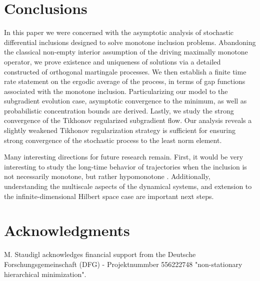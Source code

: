\documentclass[11pt,reqno]{article}
\newcommand{\1}{\mathds{1}}
\numberwithin{equation}{section}  %
\theoremstyle{plain}
\theoremstyle{definition}
\theoremstyle{remark}
\numberwithin{theorem}{section}
\numberwithin{remark}{section}
\numberwithin{example}{section}
\begin{document}
 \section{Conclusions}
 \label{sec:conclusions}
In this paper we were concerned with the asymptotic analysis of stochastic differential inclusions designed to solve monotone inclusion problems. Abandoning the classical non-empty interior assumption of the driving maximally monotone operator, we prove existence and uniqueness of solutions via a detailed constructed of orthogonal martingale processes. We then establish a finite time rate statement on the ergodic average of the process, in terms of gap functions associated with the monotone inclusion. Particularizing our model to the subgradient evolution case, asymptotic convergence to the minimum, as well as probabilistic concentration bounds are derived. Lastly, we study the strong convergence of the Tikhonov regularized subgradient flow. Our analysis reveals a slightly weakened Tikhonov regularization strategy is sufficient for ensuring strong convergence of the stochastic process to the least norm element. 

Many interesting directions for future research remain. First, it would be very interesting to study the long-time behavior of trajectories when the inclusion is not necessarily monotone, but rather hypomonotone \cite[Example 12.28]{MR1491362}. Additionally, understanding the multiscale aspects of the dynamical systems, and extension to the infinite-dimensional Hilbert space case are important next steps. 


 \section*{Acknowledgments}
M. Staudigl acknowledges financial support from the Deutsche Forschungsgemeinschaft (DFG) -  Projektnummber 556222748 "non-stationary hierarchical minimization". 




\end{document}
